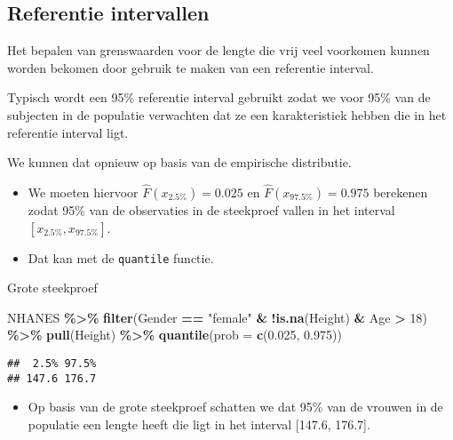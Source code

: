 \documentclass[
  12pt,dutch,coursenotes]{book}
\newenvironment{Shaded}{\begin{snugshade}}{\end{snugshade}}
\newcommand{\DataTypeTok}[1]{\textcolor[rgb]{0.13,0.29,0.53}{#1}}
\newcommand{\DecValTok}[1]{\textcolor[rgb]{0.00,0.00,0.81}{#1}}
\newcommand{\FloatTok}[1]{\textcolor[rgb]{0.00,0.00,0.81}{#1}}
\newcommand{\KeywordTok}[1]{\textcolor[rgb]{0.13,0.29,0.53}{\textbf{#1}}}
\newcommand{\NormalTok}[1]{#1}
\newcommand{\OperatorTok}[1]{\textcolor[rgb]{0.81,0.36,0.00}{\textbf{#1}}}
\newcommand{\StringTok}[1]{\textcolor[rgb]{0.31,0.60,0.02}{#1}}
\providecommand{\tightlist}{%
  \setlength{\itemsep}{0pt}\setlength{\parskip}{0pt}}
\theoremstyle{definition}
\theoremstyle{definition}
\theoremstyle{definition}
\theoremstyle{remark}
\begin{document}
\hypertarget{referentie-intervallen}{%
\subsection{Referentie intervallen}\label{referentie-intervallen}}

Het bepalen van grenswaarden voor de lengte die vrij veel voorkomen kunnen worden bekomen door gebruik te maken van een referentie interval.

Typisch wordt een 95\% referentie interval gebruikt zodat we voor 95\% van de subjecten in de populatie verwachten dat ze een karakteristiek hebben die in het referentie interval ligt.

We kunnen dat opnieuw op basis van de empirische distributie.

\begin{itemize}
\item
  We moeten hiervoor \(\hat{F}(x_{2.5\%})=0.025\) en \(\hat{F}(x_{97.5\%})=0.975\) berekenen zodat 95\% van de observaties in de steekproef vallen in het interval \([x_{2.5\%},x_{97.5\%}]\).
\item
  Dat kan met de \texttt{quantile} functie.
\end{itemize}

Grote steekproef

\begin{Shaded}
\begin{Highlighting}[]
\NormalTok{NHANES }\OperatorTok{\%\textgreater{}\%}\StringTok{ }\KeywordTok{filter}\NormalTok{(Gender }\OperatorTok{==}\StringTok{ "female"} \OperatorTok{\&}\StringTok{ }\OperatorTok{!}\KeywordTok{is.na}\NormalTok{(Height) }\OperatorTok{\&}\StringTok{ }
\StringTok{    }\NormalTok{Age }\OperatorTok{\textgreater{}}\StringTok{ }\DecValTok{18}\NormalTok{) }\OperatorTok{\%\textgreater{}\%}\StringTok{ }\KeywordTok{pull}\NormalTok{(Height) }\OperatorTok{\%\textgreater{}\%}\StringTok{ }\KeywordTok{quantile}\NormalTok{(}\DataTypeTok{prob =} \KeywordTok{c}\NormalTok{(}\FloatTok{0.025}\NormalTok{, }
    \FloatTok{0.975}\NormalTok{))}
\end{Highlighting}
\end{Shaded}

\begin{verbatim}
##  2.5% 97.5% 
## 147.6 176.7
\end{verbatim}

\begin{itemize}
\tightlist
\item
  Op basis van de grote steekproef schatten we dat 95\% van de vrouwen in de populatie een lengte heeft die ligt in het interval {[}147.6, 176.7{]}.
\end{itemize}
\end{document}
